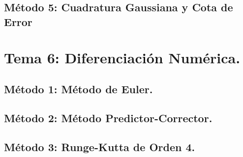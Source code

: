 \documentclass[10pt]{article}
\begin{document}
\newpage

\subsection{Método 5: Cuadratura Gaussiana y Cota de Error}
\UseRawInputEncoding


\newpage
\section{Tema 6: Diferenciación Numérica.}

\subsection{Método 1: Método de Euler.}

\UseRawInputEncoding




\newpage
\subsection{Método 2: Método Predictor-Corrector.}

\UseRawInputEncoding


\newpage
\subsection{Método 3: Runge-Kutta de Orden 4.}

\UseRawInputEncoding

\end{document}
